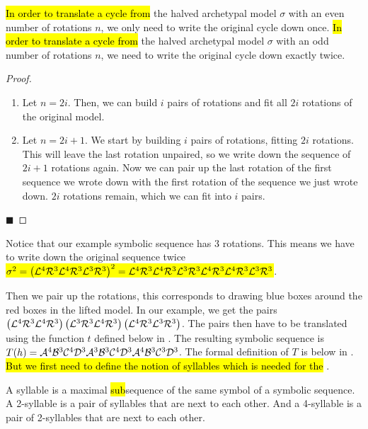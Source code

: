 \begin{lemma}
	\label{lemma:writing.down}
	\hl{In order to translate a cycle from} the halved archetypal model $\sigma$ with an even number of rotations $n$, we only need to write the original cycle down once.
	\hl{In order to translate a cycle from} the halved archetypal model $\sigma$ with an odd number of rotations $n$, we need to write the original cycle down exactly twice.
\end{lemma}

\begin{proof} \phantom{x}
	\begin{enumerate}
		\item Let $n = 2i$. Then, we can build $i$ pairs of rotations and fit all $2i$ rotations of the original model.
		\item Let $n = 2i + 1$. We start by building $i$ pairs of rotations, fitting $2i$ rotations.
		      This will leave the last rotation unpaired, so we write down the sequence of $2i + 1$ rotations again.
		      Now we can pair up the last rotation of the first sequence we wrote down with the first rotation of the sequence we just wrote down.
		      $2i$ rotations remain, which we can fit into $i$ pairs.
	\end{enumerate}
	\hfill $\blacksquare$
\end{proof}

Notice that our example symbolic sequence has 3 rotations.
This means we have to write down the original sequence twice
\hl{$\sigma^2 = \left(\mathcal{L}^4\mathcal{R}^3\mathcal{L}^4\mathcal{R}^3\mathcal{L}^3\mathcal{R}^3\right)^2 = \mathcal{L}^4\mathcal{R}^3\mathcal{L}^4\mathcal{R}^3\mathcal{L}^3\mathcal{R}^3\mathcal{L}^4\mathcal{R}^3\mathcal{L}^4\mathcal{R}^3\mathcal{L}^3\mathcal{R}^3$}.

Then we pair up the rotations, this corresponds to drawing blue boxes around the red boxes in the lifted model.
In our example, we get the pairs $\left(\mathcal{L}^4\mathcal{R}^3\mathcal{L}^4\mathcal{R}^3\right)\left(\mathcal{L}^3\mathcal{R}^3\mathcal{L}^4\mathcal{R}^3\right)\left(\mathcal{L}^4\mathcal{R}^3\mathcal{L}^3\mathcal{R}^3\right)$.
The pairs then have to be translated using the function $t$ defined below in .
The resulting symbolic sequence is $T(h) = \mathcal{A}^4\mathcal{B}^3\mathcal{C}^4\mathcal{D}^3\mathcal{A}^3\mathcal{B}^3\mathcal{C}^4\mathcal{D}^3\mathcal{A}^4\mathcal{B}^3\mathcal{C}^3\mathcal{D}^3$.
The formal definition of $T$ is below in .
\hl{But we first need to define the notion of syllables which is needed for the} .

\begin{definition}[Syllables]
	A syllable is a maximal \hl{sub}sequence of the same symbol of a symbolic sequence.
	A 2-syllable is a pair of syllables that are next to each other.
	And a 4-syllable is a pair of 2-syllables that are next to each other.
\end{definition}

